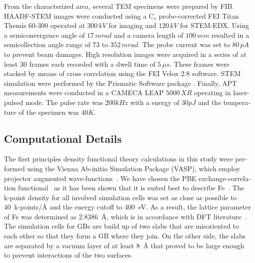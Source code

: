 \documentclass[12pt,a4paper,twoside,twocolumn,english,english]{article}
\begin{document}
\begin{otherlanguage}{english}
From the characterized area, several TEM specimens were prepared by FIB. HAADF-STEM images were conducted using a C$_s$ probe-corrected FEI Titan Themis 60-300 operated at $300\,kV$ for imaging and $120\,kV$ for STEM-EDX. Using a semiconvergence angle of $17\,mrad$ and a camera length of $100\,mm$ resulted in a semicollection angle range of $73$ to $352\,mrad$. The probe current was set to $80\,pA$ to prevent beam damages. High resolution images were acquired in a series of at least $30$ frames each recorded with a dwell time of $5\,\mu s$. These frames were stacked by means of cross correlation using the FEI Velox 2.8 software. STEM simulation were performed by the Prismatic Software package \cite{ophus_fast_2017}.
Finally, APT measurements were conducted in a CAMECA LEAP $5000\,XR$ operating in laser-pulsed mode. The pulse rate was $200\unit{kHz}$ with a energy of $30\unit{pJ}$ and the temperature of the specimen was $40\unit{K}$.






\subsection*{Computational Details}
The first principles density functional theory calculations in this study were performed using the Vienna Ab-initio Simulation Package (VASP), which employ projector augmented wave-functions~\cite{kresse1993ab,Kresse1996,Kresse1996a,Kresse1999}. We have chosen the PBE exchange-correlation functional~\cite{perdew1996generalized,perdew1998perdew} as it has been shown that it is suited best to describe Fe~\cite{Haas2009}. The k-point density for all involved simulation cells was set as close as possible to 40~k-points/\AA{} and the energy cutoff to 400~eV. As a result, the lattice parameter of Fe was determined as 2.8386~\AA{}, which is in accordance with DFT literature~\cite{scheiber_ab_2016,jin2014study}. The simulation cells for GBs are build up of two slabs that are misoriented to each other so that they form a GB where they join. On the other side, the slabs are separated by a vacuum layer of at least 8~\AA{} that proved to be large enough to prevent interactions of the two surfaces.







\end{otherlanguage}
\end{document}
